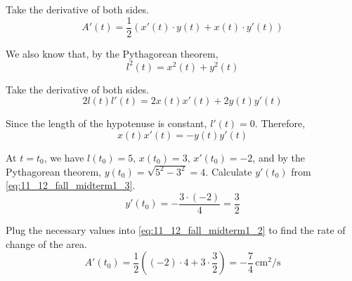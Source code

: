 \documentclass[a4paper, 12pt]{article}
\renewcommand{\headrulewidth}{0pt}
\renewcommand{\headrulewidth}{0pt}
\begin{document}
\begin{enumerate}[leftmargin=*,label=\textbf{\arabic*.}]
Take the derivative of both sides.
\begin{equation}A'(t) =\frac12\left(x'(t)\cdot y(t) + x(t)\cdot y'(t) \right)\label{eq:11_12_fall_midterm1_2}\end{equation}

We also know that, by the Pythagorean theorem,
\[l^2(t) = x^2(t)+y^2(t)\]

Take the derivative of both sides.
\[2l(t)l'(t)= 2x(t)x'(t)+2y(t)y'(t)\]

Since the length of the hypotenuse is constant, $l'(t) = 0$. Therefore,
\begin{equation}x(t)x'(t)=-y(t)y'(t)\label{eq:11_12_fall_midterm1_3}\end{equation}

At $t=t_0$, we have $l(t_0) = 5,\,x(t_0)=3,\,x'(t_0)=-2$, and by the Pythagorean theorem, $y(t_0)=\sqrt{5^2-3^2}=4$. Calculate $y'(t_0)$ from \eqref{eq:11_12_fall_midterm1_3}.
\[y'(t_0)=-\frac{3\cdot (-2)}4 = \frac32\]

Plug the necessary values into \eqref{eq:11_12_fall_midterm1_2} to find the rate of change of the area.
\[A'(t_0) =\frac12\left((-2)\cdot4+3\cdot\frac32\right)=\boxed{-\frac74\,\text{cm}^2/\text{s}}\]
\end{enumerate}

\newpage
{}
{}

\newpage
\pagestyle{fancy}
\renewcommand{\headrulewidth}{1pt}

\end{document}
